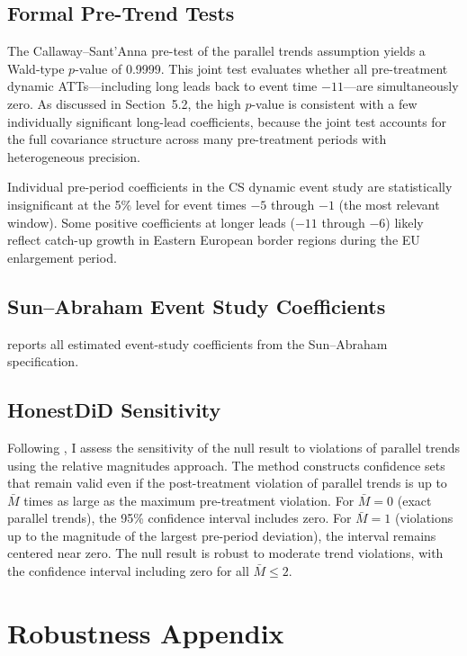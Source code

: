 \documentclass[12pt]{article}
\begin{document}
\subsection{Formal Pre-Trend Tests}

The Callaway--Sant'Anna pre-test of the parallel trends assumption yields a Wald-type $p$-value of 0.9999. This joint test evaluates whether all pre-treatment dynamic ATTs---including long leads back to event time $-11$---are simultaneously zero. As discussed in Section~5.2, the high $p$-value is consistent with a few individually significant long-lead coefficients, because the joint test accounts for the full covariance structure across many pre-treatment periods with heterogeneous precision.

Individual pre-period coefficients in the CS dynamic event study are statistically insignificant at the 5\% level for event times $-5$ through $-1$ (the most relevant window). Some positive coefficients at longer leads ($-11$ through $-6$) likely reflect catch-up growth in Eastern European border regions during the EU enlargement period.

\subsection{Sun--Abraham Event Study Coefficients}

 reports all estimated event-study coefficients from the Sun--Abraham specification.



\subsection{HonestDiD Sensitivity}

Following \cite{RambachanR2023}, I assess the sensitivity of the null result to violations of parallel trends using the relative magnitudes approach. The method constructs confidence sets that remain valid even if the post-treatment violation of parallel trends is up to $\bar{M}$ times as large as the maximum pre-treatment violation. For $\bar{M} = 0$ (exact parallel trends), the 95\% confidence interval includes zero. For $\bar{M} = 1$ (violations up to the magnitude of the largest pre-period deviation), the interval remains centered near zero. The null result is robust to moderate trend violations, with the confidence interval including zero for all $\bar{M} \leq 2$.


\section{Robustness Appendix}
\label{app:robust}
\end{document}
